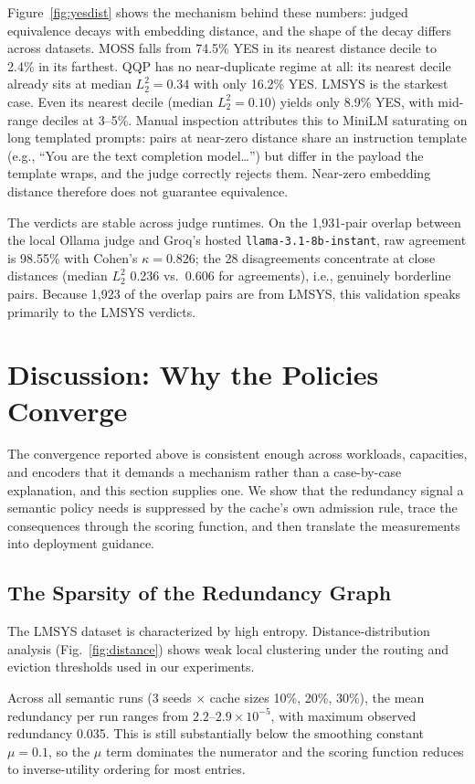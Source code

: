 \documentclass[sigconf,nonacm]{acmart}
\begin{document}
Figure~\ref{fig:yesdist} shows the mechanism behind these numbers:
judged equivalence decays with embedding distance, and the shape of
the decay differs across datasets. MOSS falls from
74.5\% YES in its nearest distance decile to 2.4\% in its farthest.
QQP has no near-duplicate regime at all: its nearest decile already
sits at median $L_2^2 = 0.34$ with only 16.2\% YES. LMSYS is the
starkest case. Even its nearest decile (median $L_2^2 = 0.10$) yields
only 8.9\% YES, with mid-range deciles at 3--5\%. Manual inspection
attributes this to MiniLM saturating on long templated prompts:
pairs at near-zero distance share an instruction template
(e.g., ``You are the text completion model\ldots'') but differ in the
payload the template wraps, and the judge correctly rejects them.
Near-zero embedding distance therefore does not guarantee equivalence.

The verdicts are stable across judge runtimes. On the 1{,}931-pair
overlap between the local Ollama judge and Groq's hosted
\texttt{llama-3.1-8b-instant}, raw agreement is 98.55\% with Cohen's
$\kappa = 0.826$; the 28 disagreements concentrate at close distances
(median $L_2^2$ 0.236 vs.\ 0.606 for agreements), i.e., genuinely
borderline pairs. Because 1{,}923 of the overlap pairs are from
LMSYS, this validation speaks primarily to the LMSYS verdicts.

\section{Discussion: Why the Policies Converge}
The convergence reported above is consistent enough across workloads, capacities, and encoders that it demands a mechanism rather than a case-by-case explanation, and this section supplies one. We show that the redundancy signal a semantic policy needs is suppressed by the cache's own admission rule, trace the consequences through the scoring function, and then translate the measurements into deployment guidance.

\subsection{The Sparsity of the Redundancy Graph}
The LMSYS dataset is characterized by high entropy. Distance-distribution analysis (Fig.~\ref{fig:distance}) shows weak local clustering under the routing and eviction thresholds used in our experiments.

Across all semantic runs (3 seeds $\times$ cache sizes 10\%, 20\%, 30\%), the mean redundancy per run ranges from $2.2\text{--}2.9 \times 10^{-5}$, with maximum observed redundancy 0.035. This is still substantially below the smoothing constant $\mu = 0.1$, so the $\mu$ term dominates the numerator and the scoring function reduces to inverse-utility ordering for most entries.
\end{document}
